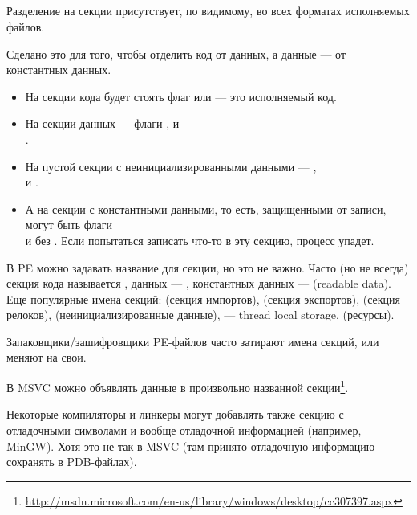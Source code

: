 \subsection{}

Разделение на секции присутствует, по видимому, во всех форматах исполняемых файлов.

Сделано это для того, чтобы отделить код от данных, а данные --- от константных данных.

\begin{itemize}
\item
На секции кода будет стоять флаг  или  --- это исполняемый код. 

\item
На секции данных --- флаги ,  и \\
.

\item
На пустой секции с неинициализированными данными --- , \\
 и .

\item
А на секции с константными данными, то есть, защищенными от записи, могут быть флаги \\
 и  без . 
Если попытаться записать что-то в эту секцию, процесс упадет.
\end{itemize}

В PE можно задавать название для секции, но это не важно.
Часто (но не всегда) секция кода называется , данных --- , константных данных ---  (readable data).
Еще популярные имена секций:  (секция импортов),  (секция экспортов),  (секция релоков),  (неинициализированные данные),  --- thread local storage,  (ресурсы).

Запаковщики/зашифровщики PE-файлов часто затирают имена секций, или меняют на свои.

В MSVC можно объявлять данные в произвольно названной секции\footnote{\url{http://msdn.microsoft.com/en-us/library/windows/desktop/cc307397.aspx}}.

Некоторые компиляторы и линкеры могут добавлять также секцию с отладочными символами и вообще отладочной информацией
(например, MinGW).
Хотя это не так в \ac{MSVC} (там принято отладочную информацию сохранять в PDB-файлах).

